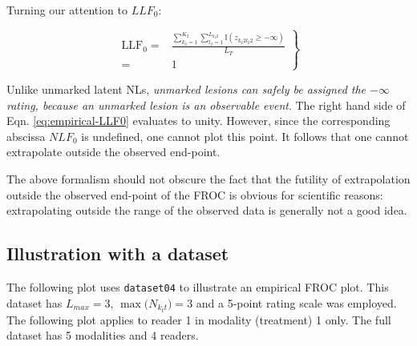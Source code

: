 \documentclass[
]{book}
\newenvironment{Shaded}{\begin{snugshade}}{\end{snugshade}}
\newcommand{\DataTypeTok}[1]{\textcolor[rgb]{0.13,0.29,0.53}{#1}}
\newcommand{\DecValTok}[1]{\textcolor[rgb]{0.00,0.00,0.81}{#1}}
\newcommand{\KeywordTok}[1]{\textcolor[rgb]{0.13,0.29,0.53}{\textbf{#1}}}
\newcommand{\NormalTok}[1]{#1}
\newcommand{\OperatorTok}[1]{\textcolor[rgb]{0.81,0.36,0.00}{\textbf{#1}}}
\newcommand{\StringTok}[1]{\textcolor[rgb]{0.31,0.60,0.02}{#1}}
\begin{document}
Turning our attention to \(LLF_0\):

\begin{equation}
\left.
\begin{aligned}
\text{LLF}_0 =& \frac{ \sum_{k_2=1}^{K_2} \sum_{l_2=1}^{L_{k_2 2}} \mathbb{I} \left ( z_{k_2 2 l_2 2} \geq  -\infty  \right ) }{L_T}\\
=& 1
\end{aligned}
\right \}
\label{eq:empirical-LLF0}
\end{equation}

Unlike unmarked latent NLs, \emph{unmarked lesions can safely be assigned the \(-\infty\) rating, because an unmarked lesion is an observable event}. The right hand side of Eqn. \eqref{eq:empirical-LLF0} evaluates to unity. However, since the corresponding abscissa \(NLF_0\) is undefined, one cannot plot this point. It follows that one cannot extrapolate outside the observed end-point.

The above formalism should not obscure the fact that the futility of extrapolation outside the observed end-point of the FROC is obvious for scientific reasons: extrapolating outside the range of the observed data is generally not a good idea.

\hypertarget{empirical-froc-plot-illustration}{%
\subsection{Illustration with a dataset}\label{empirical-froc-plot-illustration}}

The following plot uses \texttt{dataset04} \citep{zanca2009evaluation} to illustrate an empirical FROC plot. This dataset has \(L_{max} = 3\), \(\max{(N_{k_tt}})= 3\) and a 5-point rating scale was employed. The following plot applies to reader 1 in modality (treatment) 1 only. The full dataset has 5 modalities and 4 readers.

\begin{Shaded}
\end{Shaded}
\end{document}

